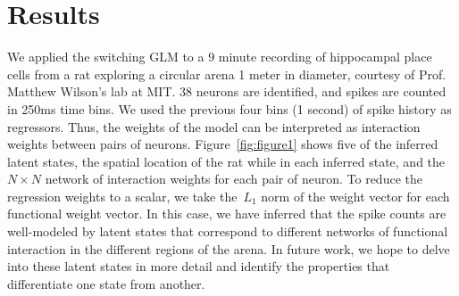 \documentclass[aos,noinfoline]{imsart} %
\begin{document}
\section{Results}
We applied the switching GLM to a 9 minute recording of hippocampal place cells from a rat exploring a circular arena 1 meter in diameter, courtesy of Prof. Matthew Wilson's lab at MIT. 38 neurons are identified, and spikes are counted in 250ms time bins. We used the previous four bins (1 second) of spike history as regressors. Thus, the weights of the model can be interpreted as interaction weights between pairs of neurons. Figure~\ref{fig:figure1} shows five of the inferred latent states, the spatial location of the rat while in each inferred state, and the~$N\times N$ network of interaction weights for each pair of neuron. To reduce the regression weights to a scalar, we take the~$L_1$ norm of the weight vector for each functional weight vector. In this case, we have inferred that the spike counts are well-modeled by latent states that correspond to different networks of functional interaction in the different regions of the arena.  In future work, we hope to delve into these latent states in more detail and identify the properties that differentiate one state from another.  


{\small }

\clearpage
\end{document}
